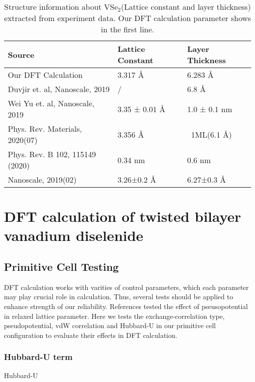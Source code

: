\begin{table}
	\caption[Structure information about VSe$_2$ extracted from experiment data]{
		Structure information about VSe$_2$(Lattice constant and layer thickness) extracted from experiment data. Our DFT calculation parameter shows in the first line.
	}
	\begin{tabular}{lll}
	\toprule
	Source                          & Lattice Constant & Layer Thickness \\
	\midrule
	Our DFT Calculation             & 3.317 Å          & 6.283 Å         \\
	Duvjir et. al, Nanoscale, 2019  & /                & 6.8 Å           \\
	Wei Yu et. al, Nanoscale, 2019  & 3.35 ± 0.01 Å    & 1.0 ± 0.1 nm    \\
	Phys. Rev. Materials, 2020(07)  & 3.356 Å          & ~1ML(6.1 Å)     \\
	Phys. Rev. B 102, 115149 (2020) & 0.34 nm          & 0.6 nm          \\
	Nanoscale, 2019(02)             & 3.26±0.2 Å       & 6.27±0.3 Å  	 \\
	\bottomrule
	\end{tabular}
\end{table}

\chapter{DFT calculation of twisted bilayer vanadium diselenide}

\section{Primitive Cell Testing}

DFT calculation works with varities of control parameters, which each parameter may play crucial role in calculation. Thus, several tests should be applied to enhance strength of our reliability. References  tested the effect of pseusopotential in relaxed lattice parameter. Here we tests the exchange-correlation type, pseudopotential, vdW correlation and Hubbard-U in our primitive cell configuration to evaluate their effects in DFT calculation.

\subsection{Hubbard-U term}
Hubbard-U